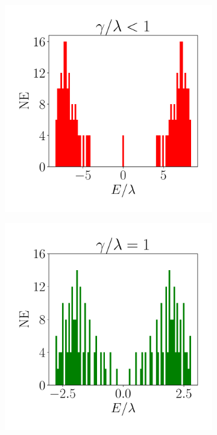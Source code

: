 \begin{figure}[h!]
     \centering
    \captionsetup[sub]{font=small}
     \begin{subfigure}[b!]{0.3 \textwidth}
         \caption{}
         \includegraphics[width=\textwidth]{Imagenes/Resultados_Hoti_Cuadrado/bars_square1.pdf}
     \end{subfigure}\hspace*{1em}
     \begin{subfigure}[b!]{0.3 \textwidth}
         \caption{}
         \includegraphics[width=\textwidth]{Imagenes/Resultados_Hoti_Cuadrado/bars_square2.pdf}

\end{subfigure}
\end{figure}
